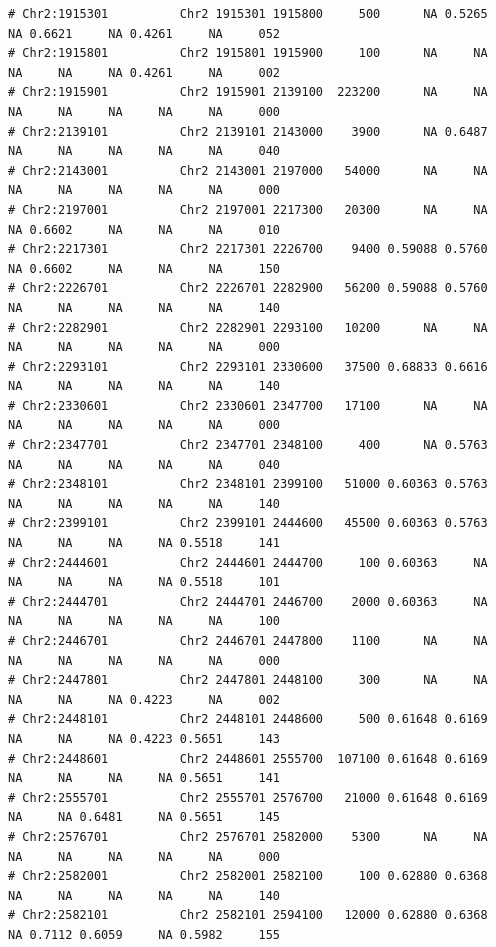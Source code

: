 \documentclass{article}\usepackage[]{graphicx}\usepackage[]{color}
\makeatletter
\newenvironment{kframe}{%
 \def\at@end@of@kframe{}%
 \ifinner\ifhmode%
  \def\at@end@of@kframe{\end{minipage}}%
  \begin{minipage}{\columnwidth}%
 \fi\fi%
 \def\FrameCommand##1{\hskip\@totalleftmargin \hskip-\fboxsep
 \colorbox{shadecolor}{##1}\hskip-\fboxsep
     \hskip-\linewidth \hskip-\@totalleftmargin \hskip\columnwidth}%
 \MakeFramed {\advance\hsize-\width
   \@totalleftmargin\z@ \linewidth\hsize
   \@setminipage}}%
 {\par\unskip\endMakeFramed%
 \at@end@of@kframe}
\newenvironment{knitrout}{}{} %
\makeatother
\begin{document}
\begin{knitrout}
\begin{kframe}
\begin{verbatim}
# Chr2:1915301          Chr2 1915301 1915800     500      NA 0.5265     NA 0.6621     NA 0.4261     NA     052
# Chr2:1915801          Chr2 1915801 1915900     100      NA     NA     NA     NA     NA 0.4261     NA     002
# Chr2:1915901          Chr2 1915901 2139100  223200      NA     NA     NA     NA     NA     NA     NA     000
# Chr2:2139101          Chr2 2139101 2143000    3900      NA 0.6487     NA     NA     NA     NA     NA     040
# Chr2:2143001          Chr2 2143001 2197000   54000      NA     NA     NA     NA     NA     NA     NA     000
# Chr2:2197001          Chr2 2197001 2217300   20300      NA     NA     NA 0.6602     NA     NA     NA     010
# Chr2:2217301          Chr2 2217301 2226700    9400 0.59088 0.5760     NA 0.6602     NA     NA     NA     150
# Chr2:2226701          Chr2 2226701 2282900   56200 0.59088 0.5760     NA     NA     NA     NA     NA     140
# Chr2:2282901          Chr2 2282901 2293100   10200      NA     NA     NA     NA     NA     NA     NA     000
# Chr2:2293101          Chr2 2293101 2330600   37500 0.68833 0.6616     NA     NA     NA     NA     NA     140
# Chr2:2330601          Chr2 2330601 2347700   17100      NA     NA     NA     NA     NA     NA     NA     000
# Chr2:2347701          Chr2 2347701 2348100     400      NA 0.5763     NA     NA     NA     NA     NA     040
# Chr2:2348101          Chr2 2348101 2399100   51000 0.60363 0.5763     NA     NA     NA     NA     NA     140
# Chr2:2399101          Chr2 2399101 2444600   45500 0.60363 0.5763     NA     NA     NA     NA 0.5518     141
# Chr2:2444601          Chr2 2444601 2444700     100 0.60363     NA     NA     NA     NA     NA 0.5518     101
# Chr2:2444701          Chr2 2444701 2446700    2000 0.60363     NA     NA     NA     NA     NA     NA     100
# Chr2:2446701          Chr2 2446701 2447800    1100      NA     NA     NA     NA     NA     NA     NA     000
# Chr2:2447801          Chr2 2447801 2448100     300      NA     NA     NA     NA     NA 0.4223     NA     002
# Chr2:2448101          Chr2 2448101 2448600     500 0.61648 0.6169     NA     NA     NA 0.4223 0.5651     143
# Chr2:2448601          Chr2 2448601 2555700  107100 0.61648 0.6169     NA     NA     NA     NA 0.5651     141
# Chr2:2555701          Chr2 2555701 2576700   21000 0.61648 0.6169     NA     NA 0.6481     NA 0.5651     145
# Chr2:2576701          Chr2 2576701 2582000    5300      NA     NA     NA     NA     NA     NA     NA     000
# Chr2:2582001          Chr2 2582001 2582100     100 0.62880 0.6368     NA     NA     NA     NA     NA     140
# Chr2:2582101          Chr2 2582101 2594100   12000 0.62880 0.6368     NA 0.7112 0.6059     NA 0.5982     155

\end{verbatim}
\end{kframe}
\end{knitrout}
\end{document}
